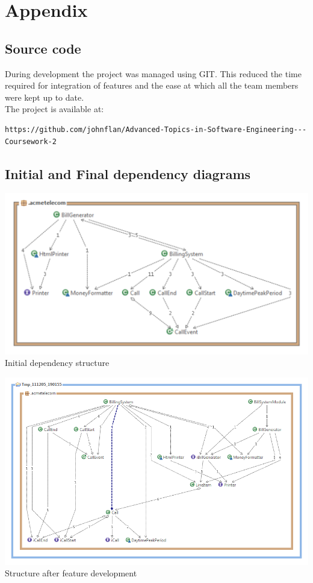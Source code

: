 \section{Appendix}

\subsection*{Source code}
During development the project was managed using GIT. This reduced the time required for integration of features and the ease at which all the team members were kept up to date.\\
The project is available at:
\begin{lstlisting}
https://github.com/johnflan/Advanced-Topics-in-Software-Engineering---Coursework-2
\end{lstlisting}

\subsection*{Initial and Final dependency diagrams}



\begin{center}
	\includegraphics[scale=0.7]{images/Acme_Telecom_Structure.pdf}
Initial dependency structure
\end{center}

\begin{center}
	\includegraphics[scale=0.45]{images/AcmeTelecom_Software_Structure_After_Refactoring.png}\\
Structure after feature development
\end{center}

